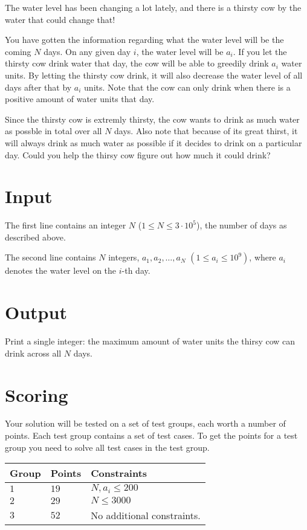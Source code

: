 
The water level has been changing a lot lately, and there is a thirsty cow by the water that could change that!

You have gotten the information regarding what the water level will be the coming $N$ days. 
On any given day $i$, the water level will be $a_i$. 
If you let the thirsty cow drink water that day, the cow will be able to greedily drink $a_i$ water units. 
By letting the thirsty cow drink, it will also decrease the water level of all days after that by $a_i$ units. 
Note that the cow can only drink when there is a positive amount of water units that day.

Since the thirsty cow is extremly thirsty, the cow wants to drink as much water as possble in total over all $N$ days.
Also note that because of its great thirst, it will always drink as much water as possible if it decides to drink on a particular day.
Could you help the thirsy cow figure out how much it could drink?

\section*{Input}
The first line contains an integer $N$ ($1 \leq N \leq 3 \cdot 10^5$), the number of days as described above.

The second line contains $N$ integers, $a_1, a_2, \dots, a_N$ $(1 \leq a_i \leq 10^9)$, where $a_i$ denotes the water level on the $i$-th day.

\section*{Output}
Print a single integer: the maximum amount of water units the thirsy cow can drink across all $N$ days. 

\section*{Scoring}
Your solution will be tested on a set of test groups, each worth a number of points. Each test group contains
a set of test cases. To get the points for a test group you need to solve all test cases in the test group.

\noindent
\begin{tabular}{| l | l | p{12cm} |}
  \hline
  \textbf{Group} & \textbf{Points} & \textbf{Constraints} \\ \hline
  $1$    & $19$       & $N, a_i \leq 200$ \\ \hline
  $2$    & $29$       & $N \leq 3000$ \\ \hline
  $3$    & $52$       & No additional constraints. \\ \hline
\end{tabular}
